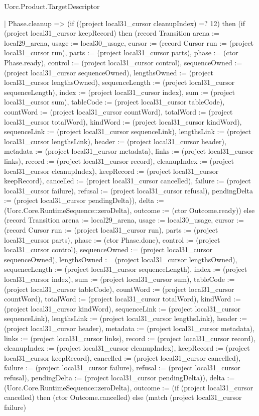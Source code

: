 \begin{lexlean}{Uorc.Product.TargetDescriptor}
\begin{semanticmodule}
{    | Phase.cleanup => (if ((project local31_cursor cleanupIndex) =? 12) then (if (project local31_cursor keepRecord) then (record Transition {arena := local29_arena, usage := local30_usage, cursor := (record Cursor {run := (project local31_cursor run), parts := (project local31_cursor parts), phase := (ctor Phase.ready), control := (project local31_cursor control), sequenceOwned := (project local31_cursor sequenceOwned), lengthsOwned := (project local31_cursor lengthsOwned), sequenceLength := (project local31_cursor sequenceLength), index := (project local31_cursor index), sum := (project local31_cursor sum), tableCode := (project local31_cursor tableCode), countWord := (project local31_cursor countWord), totalWord := (project local31_cursor totalWord), kindWord := (project local31_cursor kindWord), sequenceLink := (project local31_cursor sequenceLink), lengthsLink := (project local31_cursor lengthsLink), header := (project local31_cursor header), metadata := (project local31_cursor metadata), links := (project local31_cursor links), record := (project local31_cursor record), cleanupIndex := (project local31_cursor cleanupIndex), keepRecord := (project local31_cursor keepRecord), cancelled := (project local31_cursor cancelled), failure := (project local31_cursor failure), refusal := (project local31_cursor refusal), pendingDelta := (project local31_cursor pendingDelta)}), delta := (Uorc.Core.RuntimeSequence::zeroDelta), outcome := (ctor Outcome.ready)}) else (record Transition {arena := local29_arena, usage := local30_usage, cursor := (record Cursor {run := (project local31_cursor run), parts := (project local31_cursor parts), phase := (ctor Phase.done), control := (project local31_cursor control), sequenceOwned := (project local31_cursor sequenceOwned), lengthsOwned := (project local31_cursor lengthsOwned), sequenceLength := (project local31_cursor sequenceLength), index := (project local31_cursor index), sum := (project local31_cursor sum), tableCode := (project local31_cursor tableCode), countWord := (project local31_cursor countWord), totalWord := (project local31_cursor totalWord), kindWord := (project local31_cursor kindWord), sequenceLink := (project local31_cursor sequenceLink), lengthsLink := (project local31_cursor lengthsLink), header := (project local31_cursor header), metadata := (project local31_cursor metadata), links := (project local31_cursor links), record := (project local31_cursor record), cleanupIndex := (project local31_cursor cleanupIndex), keepRecord := (project local31_cursor keepRecord), cancelled := (project local31_cursor cancelled), failure := (project local31_cursor failure), refusal := (project local31_cursor refusal), pendingDelta := (project local31_cursor pendingDelta)}), delta := (Uorc.Core.RuntimeSequence::zeroDelta), outcome := (if (project local31_cursor cancelled) then (ctor Outcome.cancelled) else (match (project local31_cursor failure)
}}
\end{semanticmodule}
\end{lexlean}
